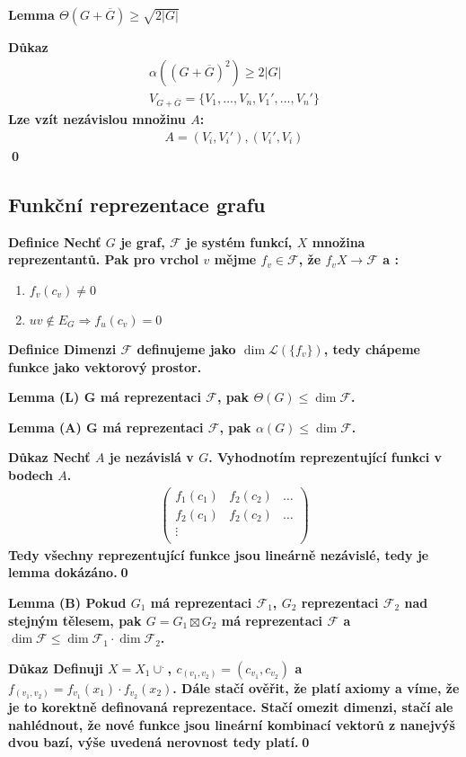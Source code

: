 \documentclass[a4paper,12pt,titlepage]{article}
\newcommand{\shn}{\Theta}
\newcommand{\lm}{\smallskip\noindent\bf Lemma\rm{} }
\newcommand{\dk}{\smallskip\noindent\bf Důkaz\rm{} }
\newcommand{\df}{\smallskip\noindent\bf Definice\rm{} }
\newcommand{\F}{\mathcal{F}}
\renewcommand{\L}{\mathcal{L}}
\renewcommand{\L}{\mathcal{L}}
\begin{document}
\lm $\shn(G + \overline{G}) \geq \sqrt{2|G|}$

\dk 
\begin{align}
	\alpha ((G+\overline G)^2) \geq 2|G| \\
	V_{G+\overline G} = \{ V_1, ..., V_n, V_1', ..., V_n'\}
\end{align}
Lze vzít nezávislou množinu $A$:
\begin{align}
	A = (V_i, V_i'), (V_i', V_i)
\end{align}
\qed


\subsection{Funkční reprezentace grafu}
\df Nechť $G$ je graf, $\F$ je systém funkcí, $X$ množina reprezentantů. Pak pro vrchol $v$ mějme $f_v \in \F$, že $f_v X \to \F$ a :
\begin{enumerate}
	\item $f_v(c_v) \neq 0$
	\item $uv \notin E_G \Rightarrow f_u(c_v) = 0$
\end{enumerate}

\df Dimenzi $\F$ definujeme jako $\dim\L(\{f_v\})$, tedy chápeme funkce jako vektorový prostor.


\lm(L) G má reprezentaci $\F$, pak $\shn(G) \leq \dim \F$.

\lm(A) G má reprezentaci $\F$, pak $\alpha(G) \leq \dim \F$.\par
\dk Nechť $A$ je nezávislá v $G$. Vyhodnotím reprezentující funkci v bodech $A$.
\begin{align}
\left(
	\begin{matrix}
		f_1(c_1) & f_2(c_2) & \dots \\
		f_2(c_1) & f_2(c_2) & \dots \\
		\vdots &&\\
	\end{matrix}\right)
\end{align}
Tedy všechny reprezentující funkce jsou lineárně nezávislé, tedy je lemma dokázáno.\qed

\lm(B) Pokud $G_1$ má reprezentaci $\F_1$, $G_2$ reprezentaci $\F_2$ nad stejným tělesem, pak $G = G_1 \boxtimes G_2$ má reprezentaci $\F$ a $\dim\F \leq \dim\F_1 \cdot \dim\F_2$.

\dk Definuji $X = X_1 \cup^.$, $c_(v_1,v_2) = (c_{v_1}, c_{v_2})$ a $f_(v_1, v_2) = f_{v_1}(x_1) \cdot f_{v_2}(x_2)$.
Dále stačí ověřit, že platí axiomy a víme, že je to korektně definovaná reprezentace. Stačí omezit dimenzi, stačí ale nahlédnout, že nové funkce jsou lineární kombinací vektorů z nanejvýš dvou bazí, výše uvedená nerovnost tedy platí.\qed
\end{document}
